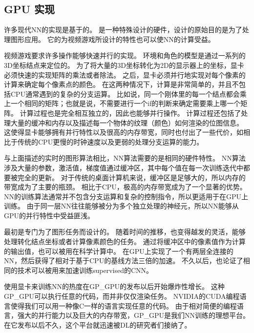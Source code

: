 \subsection{GPU 实现}
\label{sec:gpu_implementations}

许多现代\gls{NN}的实现是基于的。
是一种特殊设计的硬件，设计的原始目的是为了处理图形应用。
它的为视频游戏所设计的特性也可以使\gls{NN}的计算受益。

视频游戏要求许多操作能够快速并行的实现。
环境和角色的模型是通过一系列的3D坐标结点来定位的。
为了将大量的3D坐标转化为2D的显示器上的坐标，显卡必须快速的实现矩阵的乘法或者除法。
之后，显卡必须并行地实现对每个像素的计算来确定每个像素点的颜色。
在这两种情况下，计算是非常简单的，并且不包括CPU通常遇到的复杂的分支运算。
比如说，同一个刚体里的每一个结点都会乘上一个相同的矩阵；也就是说，不需要进行一个if的判断来确定需要乘上哪一个矩阵。
计算过程也是完全相互独立的，因此也能够并行操作。
计算过程还包括了处理大量的缓冲和内存以及描述每一个物体的纹理（颜色）如何渲染的位图信息。
这使得显卡能够拥有并行特性以及很高的内存带宽，同时也付出了一些代价，如相比于传统的CPU更慢的时钟速度以及更弱的处理分支运算的能力。


与上面描述的实时的图形算法相比，\gls{NN}算法需要的是相同的硬件特性。
\gls{NN}算法涉及大量的参数，激活值，梯度值通过缓冲区，其中每个值在每一次训练迭代中都要被完全的更新。
对于传统的桌面计算机来说，缓冲区是足够大的，所以内存的带宽成为了主要的瓶颈。
相比于CPU，极高的内存带宽成为了一个显著的优势。
\gls{NN}的训练算法通常并不包含分支运算和复杂的控制指令，所以更适用于在GPU上训练。
由于同一层\gls{NN}往往能够被分为多个独立处理的神经元，所以\gls{NN}能够从GPU的并行特性中受益匪浅。


最初是专门为了图形任务而设计的。
随着时间的推移，也变得越发的灵活，能够处理转化结点坐标或者计算像素颜色的任务。
通过将缓冲区中的像素值作为计算的输出值，也可以被用在科学计算中。
\citet{Steinkrau2005}在GPU上实现了一个有两层全连接的\gls{NN}，然后获得了相对于基于CPU的基线方法三倍的加速。
不久以后，\citet{chellapilla:inria-00112631}也论证了相同的技术可以被用来加速训练\gls{supervised}的\gls{CNN}。


使用显卡来训练\gls{NN}的热度在\gls{GP_GPU}的发布以后开始爆炸性增长。
这种\gls{GP_GPU}可以执行任意的代码，而并非仅仅渲染任务。
NVIDIA的CUDA编程语言使得我们可以用一种像C一样的语言实现任意的代码。
由于相对简便的编程语言，强大的并行能力以及巨大的内存带宽，\gls{GP_GPU}是我们\gls{NN}训练的理想平台。
在它发布以后不久，这个平台就迅速被\gls{DL}的研究者们接纳了\citep{RainaICML09-small,Ciresan-2010}。




